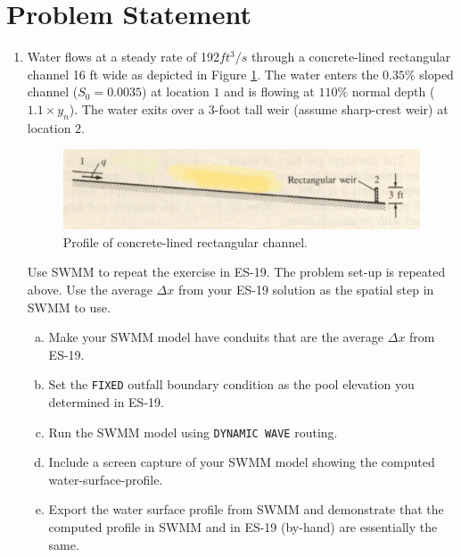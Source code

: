 \documentclass[12pt]{article}
\begin{document}
\section*{\small{Problem Statement}}
\begin{enumerate}
\item Water flows at a steady rate of 192$ft^3/s$ through a concrete-lined rectangular channel 16 ft wide as depicted in Figure \ref{fig:channel_profile}. The water enters the $0.35 \%$ sloped channel ($S_0 = 0.0035$) at location $1$ and is flowing at $110\%$ normal depth ($1.1 \times y_n$).  The water exits over a 3-foot tall weir (assume sharp-crest weir) at location $2$.

\begin{figure}[htbp] %
   \centering
   \includegraphics[width=6in]{channel_profile.jpg} 
   \caption{Profile of concrete-lined rectangular channel.}
   \label{fig:channel_profile}
\end{figure}

Use SWMM to repeat the exercise in ES-19.  The problem set-up is repeated above.  Use the average $\Delta x$ from your ES-19 solution as the spatial step in SWMM to use.

\begin{enumerate}[a)]
\item Make your SWMM model have conduits that are the average $\Delta x$ from ES-19.
\item Set the \texttt{FIXED} outfall boundary condition as the pool elevation you determined in ES-19.
\item Run the SWMM model using \texttt{DYNAMIC WAVE} routing.
\item Include a screen capture of your SWMM model showing the computed water-surface-profile.   
\item Export the water surface profile from SWMM and demonstrate that the computed profile in SWMM and in ES-19 (by-hand) are essentially the same.
\end{enumerate}




\end{enumerate}
\end{document}
